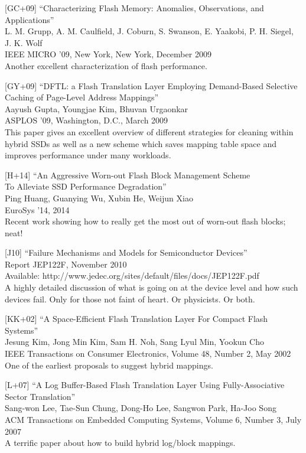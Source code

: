 {[}GC+09{]} ``Characterizing Flash Memory: Anomalies, Observations, and
Applications''\\
L. M. Grupp, A. M. Caulfield, J. Coburn, S. Swanson, E. Yaakobi, P. H.
Siegel, J. K. Wolf\\
IEEE MICRO '09, New York, New York, December 2009\\
Another excellent characterization of flash performance.

{[}GY+09{]} ``DFTL: a Flash Translation Layer Employing Demand-Based
Selective Caching of Page-Level Address Mappings''\\
Aayush Gupta, Youngjae Kim, Bhuvan Urgaonkar\\
ASPLOS '09, Washington, D.C., March 2009\\
This paper gives an excellent overview of different strategies for
cleaning within hybrid SSDs as well as a new scheme which saves mapping
table space and improves performance under many workloads.

{[}H+14{]} ``An Aggressive Worn-out Flash Block Management Scheme\\
To Alleviate SSD Performance Degradation''\\
Ping Huang, Guanying Wu, Xubin He, Weijun Xiao\\
EuroSys '14, 2014\\
Recent work showing how to really get the most out of worn-out flash
blocks; neat!

{[}J10{]} ``Failure Mechanisms and Models for Semiconductor Devices''\\
Report JEP122F, November 2010\\
Available: http://www.jedec.org/sites/default/files/docs/JEP122F.pdf\\
A highly detailed discussion of what is going on at the device level and
how such devices fail. Only for those not faint of heart. Or physicists.
Or both.

{[}KK+02{]} ``A Space-Efficient Flash Translation Layer For Compact
Flash Systems''\\
Jesung Kim, Jong Min Kim, Sam H. Noh, Sang Lyul Min, Yookun Cho\\
IEEE Transactions on Consumer Electronics, Volume 48, Number 2, May
2002\\
One of the earliest proposals to suggest hybrid mappings.

{[}L+07{]} ``A Log Buffer-Based Flash Translation Layer Using
Fully-Associative Sector Translation''\\
Sang-won Lee, Tae-Sun Chung, Dong-Ho Lee, Sangwon Park, Ha-Joo Song\\
ACM Transactions on Embedded Computing Systems, Volume 6, Number 3, July
2007\\
A terrific paper about how to build hybrid log/block mappings.

